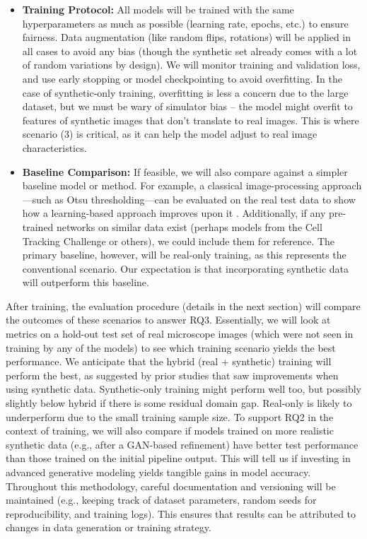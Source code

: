 \documentclass[
oneside,      %
openany       %
]{imc-inf}
\begin{document}
\begin{itemize}
		\item \textbf{Training Protocol:} All models will be trained with the same hyperparameters as much as possible (learning rate, epochs, etc.) to ensure fairness. Data augmentation (like random flips, rotations) will be applied in all cases to avoid any bias (though the synthetic set already comes with a lot of random variations by design). We will monitor training and validation loss, and use early stopping or model checkpointing to avoid overfitting. In the case of synthetic-only training, overfitting is less a concern due to the large dataset, but we must be wary of simulator bias – the model might overfit to features of synthetic images that don’t translate to real images. This is where scenario (3) is critical, as it can help the model adjust to real image characteristics.
		
		\item \textbf{Baseline Comparison:} If feasible, we will also compare against a simpler baseline model or method. For example, a classical image-processing approach—such as Otsu thresholding—can be evaluated on the real test data to show how a learning-based approach improves upon it \cite{otsu1979threshold}. Additionally, if any pre-trained networks on similar data exist (perhaps models from the Cell Tracking Challenge or others), we could include them for reference. The primary baseline, however, will be real-only training, as this represents the conventional scenario. Our expectation is that incorporating synthetic data will outperform this baseline.
		
		
	\end{itemize}
	
	After training, the evaluation procedure (details in the next section) will compare the outcomes of these scenarios to answer RQ3. Essentially, we will look at metrics on a hold-out test set of real microscope images (which were not seen in training by any of the models) to see which training scenario yields the best performance. We anticipate that the hybrid (real + synthetic) training will perform the best, as suggested by prior studies that saw improvements when using synthetic data\cite{zhang2023synthetic}. Synthetic-only training might perform well too, but possibly slightly below hybrid if there is some residual domain gap. Real-only is likely to underperform due to the small training sample size.
	To support RQ2 in the context of training, we will also compare if models trained on more realistic synthetic data (e.g., after a GAN-based refinement) have better test performance than those trained on the initial pipeline output. This will tell us if investing in advanced generative modeling yields tangible gains in model accuracy.
	Throughout this methodology, careful documentation and versioning will be maintained (e.g., keeping track of dataset parameters, random seeds for reproducibility, and training logs). This ensures that results can be attributed to changes in data generation or training strategy.
	
\end{document}
